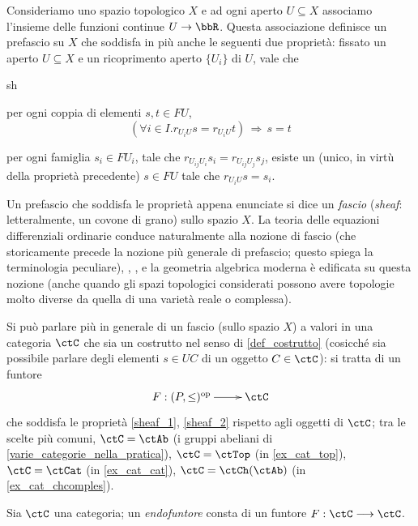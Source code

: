 Consideriamo uno spazio topologico \(X\) e ad ogni aperto \(U\subseteq X\) associamo l'insieme delle funzioni continue \(U\to \bbR\). Questa associazione definisce un prefascio su \(X\) che soddisfa in più anche le seguenti due proprietà: fissato un aperto \(U\subseteq X\) e un ricoprimento aperto \(\{U_i\}\) di \(U\), vale che
\begin{enumtag}{sh}
	\item \label{sheaf_1} per ogni coppia di elementi \(s,t \in FU\),
	\[(\forall i \in I.r_{U_iU}s = r_{U_iU} t) \,\Rightarrow\, s=t\]
	\item \label{sheaf_2} per ogni famiglia \(s_i \in FU_i\), tale che \(r_{U_{ij}U_i}s_i = r_{U_{ij}U_j}s_j\), esiste un (unico, in virtù della proprietà precedente) \(s\in FU\) tale che \(r_{U_iU}s=s_i\).
\end{enumtag}
\begin{remark}
	Un prefascio che soddisfa le proprietà appena enunciate si dice un \emph{fascio} (\emph{sheaf}: letteralmente, un covone di grano) sullo spazio \(X\). La teoria delle equazioni differenziali ordinarie conduce naturalmente alla nozione di fascio (che storicamente precede la nozione più generale di prefascio; questo spiega la terminologia peculiare), \cite[Cap. II]{mac1992sheaves}, \cite{Tennison1975,Borceux1994a,Borceux1989-gf,pedicchiofoundations}, e la geometria algebrica moderna è edificata su questa nozione (anche quando gli spazi topologici considerati possono avere topologie molto diverse da quella di una varietà reale o complessa).

	Si può parlare più in generale di un fascio (sullo spazio \(X\)) a valori in una categoria \(\ctC\) che sia un costrutto nel senso di \ref{def_costrutto} (cosicché sia possibile parlare degli elementi \(s\in UC\) di un oggetto \(C\in \ctC\)): si tratta di un funtore
	\[\xymatrix{F : (P,\le)^\op \ar[r] & \ctC}\]
	che soddisfa le proprietà \ref{sheaf_1}, \ref{sheaf_2} rispetto agli oggetti di \(\ctC\); tra le scelte più comuni, \(\ctC=\ctAb\) (i gruppi abeliani di \ref{varie_categorie_nella_pratica}), \(\ctC=\ctTop\) (in \ref{ex_cat_top}), \(\ctC=\ctCat\) (in \ref{ex_cat_cat}), \(\ctC = \ctCh(\ctAb)\) (in \ref{ex_cat_chcomples}).
\end{remark}
\begin{definition}[Endofuntore]\label{def_endofuntore}
	Sia \(\ctC\) una categoria; un \emph{endofuntore} consta di un funtore \(F : \ctC\fun\ctC\).
\end{definition}
